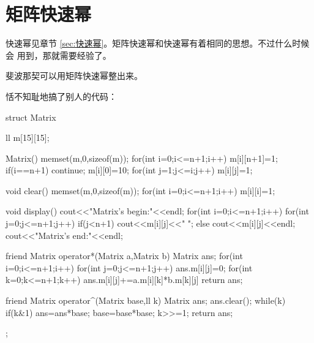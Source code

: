 \section{矩阵快速幂}
\label{sec:矩阵快速幂}

快速幂见章节 \ref{sec:快速幂}。矩阵快速幂和快速幂有着相同的思想。不过什么时候会
用到，那就需要经验了。

斐波那契可以用矩阵快速幂整出来。

恬不知耻地搞了别人的代码：
\begin{Cpp}
struct Matrix{
  ll m[15][15];
  
  Matrix(){
    memset(m,0,sizeof(m));
    for(int i=0;i<=n+1;i++){
      m[i][n+1]=1;
      if(i==n+1) continue;
      m[i][0]=10;
      for(int j=1;j<=i;j++)
        m[i][j]=1;
    }
  }
  
  void clear(){
    memset(m,0,sizeof(m));
    for(int i=0;i<=n+1;i++)
      m[i][i]=1;
  }
  
  void display(){
    cout<<"Matrix's begin:"<<endl;
    for(int i=0;i<=n+1;i++)
      for(int j=0;j<=n+1;j++)
        if(j<n+1) cout<<m[i][j]<<" ";
        else cout<<m[i][j]<<endl;
    cout<<"Matrix's end:"<<endl;
  }
  
  friend Matrix operator*(Matrix a,Matrix b){
    Matrix ans;
    for(int i=0;i<=n+1;i++)
      for(int j=0;j<=n+1;j++){
        ans.m[i][j]=0;
        for(int k=0;k<=n+1;k++)
          ans.m[i][j]+=a.m[i][k]*b.m[k][j]%
      }
    return ans;
  }
  
  friend Matrix operator^(Matrix base,ll k){
    Matrix ans;
    ans.clear();
    while(k){
      if(k&1) ans=ans*base;
      base=base*base;
      k>>=1;
    }
    return ans;
  }
};
\end{Cpp}
